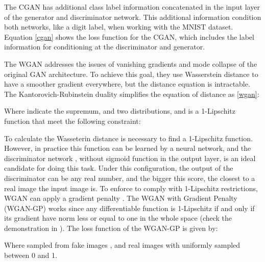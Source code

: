 \documentclass[journal]{IEEEtran}
\begin{document}
The CGAN has additional class label information concatenated in the input layer of the generator and discriminator network. This additional information condition both networks, like a digit label, when working with the MNIST dataset.  Equation \eqref{cgan} shows the loss function for the CGAN, which includes the label information  for conditioning at the discriminator and generator.








The WGAN addresses the issues of vanishing gradients and mode collapse of the original GAN architecture. To achieve this goal, they use Wasserstein distance to have a smoother gradient everywhere, but the distance equation is intractable. The Kantorovich-Rubinstein duality simplifies the equation of distance as \eqref{wgan}:




 Where  indicate the supremum,  and  two distributions, and  is a 1-Lipschitz function that meet the following constraint:
 
 
 
  To calculate the Wasseterin distance is necessary to find a 1-Lipschitz  function. However, in practice this function can be learned by a neural network, and the discriminator network , without sigmoid function in the output layer, is an ideal candidate for doing this task. Under this configuration, the output of the discriminator can be any real number, and the bigger this score, the closest to a real image the input image is. To enforce  to comply with 1-Lipschitz restrictions, WGAN can apply a gradient penalty \cite{wgan-gp}. The WGAN with Gradient Penalty (WGAN-GP) works since any differentiable function  is 1-Lipschitz if and only if its gradient have norm less or equal to one in the whole space (check the demonstration in \cite{wgan-gp}). The loss function of the WGAN-GP is given by:
\begin{comment}



\end{comment}






Where  sampled from fake images , and real images  with  uniformly sampled between 0 and 1.
\end{document}
